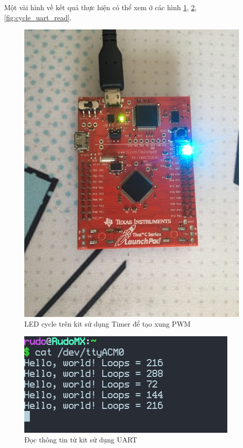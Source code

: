 Một vài hình về kết quả thực hiện có thể xem ở các hình \ref{fig:cycle_kit}, \ref{fig:cycle_uart_out}, \ref{fig:cycle_uart_read}.

\begin{figure}[ht]
\centering
\includegraphics[scale=0.4]{images/cycle_kit.jpg}
\caption{LED cycle trên kit sử dụng Timer để tạo xung PWM}
\label{fig:cycle_kit}
\end{figure}

\begin{figure}[ht]
\centering
\includegraphics[scale=0.7]{images/cycle_uart_out.png}
\caption{Đọc thông tin từ kit sử dụng UART}
\label{fig:cycle_uart_out}
\end{figure}

